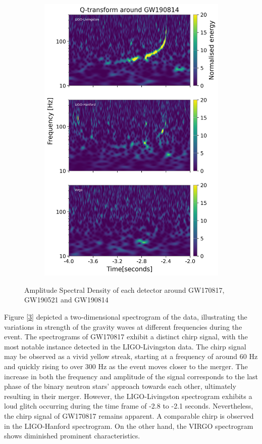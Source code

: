 \begin{figure}[htb]
\begin{subfigure}{0.45\textwidth}
        \label{fig: gw190814qtransform}
    \end{subfigure}
    \hfill
    \begin{subfigure}{0.45\textwidth}
        \centering
        \includegraphics[width=0.65\linewidth]{GWanalysisProject_codefile/qtransformplot/GW190814_qtransform.png}
        \label{fig: gw190521qtransform}
    \end{subfigure}
    \caption{Amplitude Spectral Density of each detector around GW170817, GW190521 and GW190814}
    \label{fig: qtransformplot}
\end{figure}

Figure [\ref{fig: qtransformplot}] depicted a two-dimensional spectrogram of the data, illustrating the variations in strength of the gravity waves at different frequencies during the event. 
The spectrograms of GW170817 exhibit a distinct chirp signal, with the most notable instance detected in the LIGO-Livingston data. The chirp signal may be observed as a vivid yellow streak, starting at a frequency of around 60 Hz and quickly rising to over 300 Hz as the event moves closer to the merger. The increase in both the frequency and amplitude of the signal corresponds to the last phase of the binary neutron stars' approach towards each other, ultimately resulting in their merger. However, the LIGO-Livingston spectrogram exhibits a loud glitch occurring during the time frame of -2.8 to -2.1 seconds. Nevertheless, the chirp signal of GW170817 remains apparent. A comparable chirp is observed in the LIGO-Hanford spectrogram. On the other hand, the VIRGO spectrogram shows diminished prominent characteristics. 

